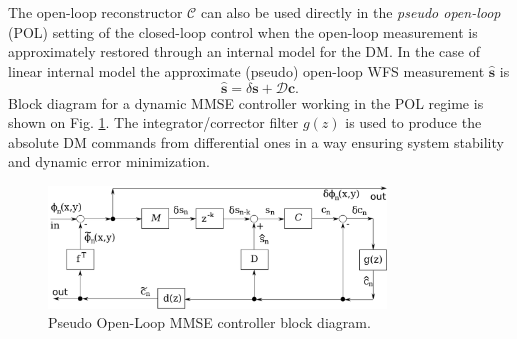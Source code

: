 The open-loop reconstructor $\mathcal{C}$ can also
be used directly in the \emph{pseudo open-loop}  (POL) setting of the closed-loop control when the open-loop
measurement is approximately restored
through an internal model for the DM. In the case of linear internal model the
approximate (pseudo) open-loop WFS measurement $\hat{\bm{s}}$ is
\begin{equation} \label{eq:wfs-restoration}
	\hat{\bm{s}} = \delta \bm{s} + \mathcal{D} \bm{c}.
\end{equation}
Block diagram for a dynamic MMSE controller working in the POL regime is
shown on Fig. \ref{fig:POL}. The integrator/corrector filter $g(z)$ is used to
produce the absolute DM
commands from differential ones in a way ensuring system stability and dynamic
error minimization.
\begin{figure}[htp]
\begin{center}
 \includegraphics[width = 0.8\textwidth]{POL.png}
\end{center}
\caption{Pseudo Open-Loop MMSE controller block diagram.}
\label{fig:POL}
\end{figure}


